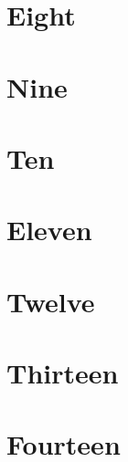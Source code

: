 \documentclass{beamer}
\begin{document}
\section{Eight}
\begin{frame}\end{frame}
\section{Nine}
\begin{frame}\end{frame}
\section{Ten}
\begin{frame}\end{frame}
\section{Eleven}
\begin{frame}\end{frame}
\section{Twelve}
\begin{frame}\end{frame}
\section{Thirteen}
\begin{frame}\end{frame}
\section{Fourteen}
\begin{frame}\end{frame}
\end{document}
